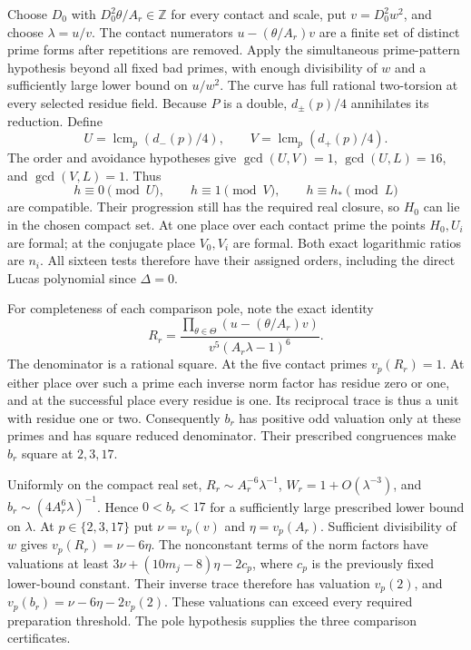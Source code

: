 \documentclass[11pt,a4paper]{article}
\theoremstyle{definition}
\theoremstyle{remark}
\begin{document}
Choose $D_0$ with $D_0^2\theta/A_r\in\mathbb Z$ for every contact
and scale, put $v=D_0^2w^2$, and choose $\lambda=u/v$.
The contact numerators $u-(\theta/A_r)v$ are a finite set of distinct
prime forms after repetitions are removed.  Apply the simultaneous
prime-pattern hypothesis beyond all fixed bad primes, with enough
divisibility of $w$ and a sufficiently large lower bound on $u/w^2$.
The curve has full rational two-torsion at every selected residue
field.  Because $P$ is a double, $d_\pm(p)/4$ annihilates its
reduction.  Define
\[
 U=\operatorname{lcm}_p(d_-(p)/4),\qquad
 V=\operatorname{lcm}_p(d_+(p)/4).
\]
The order and avoidance hypotheses give
$\gcd(U,V)=1$, $\gcd(U,L)=16$, and $\gcd(V,L)=1$.
Thus
\[
             h\equiv0\pmod U,\qquad h\equiv1\pmod V,
             \qquad h\equiv h_*\pmod L
\]
are compatible.  Their progression still has the required real
closure, so $H_0$ can lie in the chosen compact set.  At one place over
each contact prime the points $H_0,U_i$ are formal; at the conjugate
place $V_0,V_i$ are formal.  Both exact logarithmic ratios are $n_i$.
All sixteen tests therefore have their assigned orders, including the
direct Lucas polynomial since $\Delta=0$.

For completeness of each comparison pole, note the exact identity
\[
 R_r=\frac{\prod_{\theta\in\Theta}(u-(\theta/A_r)v)}
                     {v^5(A_r\lambda-1)^6}.
\]
The denominator is a rational square.  At the five contact primes
$v_p(R_r)=1$.  At either place over such a prime each inverse norm
factor has residue zero or one, and at the successful place every
residue is one.  Its reciprocal trace is thus a unit with residue
one or two.  Consequently $b_r$ has positive odd valuation only at
these primes and has square reduced denominator.  Their prescribed
congruences make $b_r$ square at $2,3,17$.

Uniformly on the compact real set,
$R_r\sim A_r^{-6}\lambda^{-1}$,
$W_r=1+O(\lambda^{-3})$, and
$b_r\sim(4A_r^6\lambda)^{-1}$.
Hence $0<b_r<17$ for a sufficiently large prescribed lower bound on
$\lambda$.  At $p\in\{2,3,17\}$ put $\nu=v_p(v)$ and
$\eta=v_p(A_r)$.  Sufficient divisibility of $w$ gives
$v_p(R_r)=\nu-6\eta$.  The nonconstant terms of the norm factors
have valuations at least $3\nu+(10m_j-8)\eta-2c_p$, where $c_p$
is the previously fixed lower-bound constant.  Their inverse trace
therefore has valuation $v_p(2)$, and
$v_p(b_r)=\nu-6\eta-2v_p(2)$.  These valuations can exceed every
required preparation threshold.  The pole hypothesis supplies the
three comparison certificates.
\end{document}
